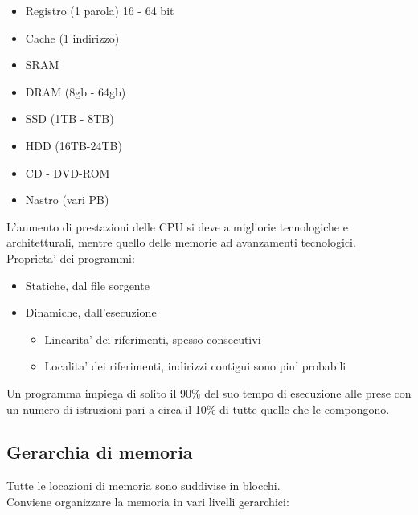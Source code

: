 \documentclass[arch.tex]{subfiles}
\begin{document}
\begin{itemize}
	\item Registro (1 parola) 16 - 64 bit
	\item Cache (1 indirizzo)
	\item SRAM
	\item DRAM (8gb - 64gb)
	\item SSD (1TB - 8TB)
	\item HDD (16TB-24TB)
	\item CD - DVD-ROM
	\item Nastro (vari PB)
\end{itemize}
L'aumento di prestazioni delle CPU si deve a migliorie tecnologiche e architetturali, mentre
quello delle memorie  ad avanzamenti tecnologici.\\
Proprieta' dei programmi: 

\begin{itemize}
	\item Statiche, dal file sorgente
	\item Dinamiche, dall'esecuzione
		\begin{itemize}
			\item Linearita' dei riferimenti, spesso consecutivi
			\item Localita' dei riferimenti, indirizzi contigui sono piu' probabili
		\end{itemize}
\end{itemize}

\begin{defn}[Congettura 90/10]
Un programma impiega di solito il 90\% del suo tempo di esecuzione alle prese 
con un numero di istruzioni pari a circa il 10\% di tutte quelle che le compongono.
\end{defn}

\subsection{Gerarchia di memoria}
Tutte le locazioni di memoria sono suddivise in blocchi. \\
Conviene organizzare la memoria in vari livelli gerarchici:
\end{document}
